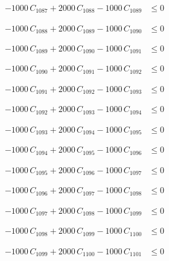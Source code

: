 \documentclass[a4paper,11pt]{article}
\begin{document}
\begin{align}
-1000\,C_{1087} + 2000\,C_{1088} - 1000\,C_{1089} &\leq 0 \nonumber
\end{align}

\begin{align}
-1000\,C_{1088} + 2000\,C_{1089} - 1000\,C_{1090} &\leq 0 \nonumber
\end{align}

\begin{align}
-1000\,C_{1089} + 2000\,C_{1090} - 1000\,C_{1091} &\leq 0 \nonumber
\end{align}

\begin{align}
-1000\,C_{1090} + 2000\,C_{1091} - 1000\,C_{1092} &\leq 0 \nonumber
\end{align}

\begin{align}
-1000\,C_{1091} + 2000\,C_{1092} - 1000\,C_{1093} &\leq 0 \nonumber
\end{align}

\begin{align}
-1000\,C_{1092} + 2000\,C_{1093} - 1000\,C_{1094} &\leq 0 \nonumber
\end{align}

\begin{align}
-1000\,C_{1093} + 2000\,C_{1094} - 1000\,C_{1095} &\leq 0 \nonumber
\end{align}

\begin{align}
-1000\,C_{1094} + 2000\,C_{1095} - 1000\,C_{1096} &\leq 0 \nonumber
\end{align}

\begin{align}
-1000\,C_{1095} + 2000\,C_{1096} - 1000\,C_{1097} &\leq 0 \nonumber
\end{align}

\begin{align}
-1000\,C_{1096} + 2000\,C_{1097} - 1000\,C_{1098} &\leq 0 \nonumber
\end{align}

\begin{align}
-1000\,C_{1097} + 2000\,C_{1098} - 1000\,C_{1099} &\leq 0 \nonumber
\end{align}

\begin{align}
-1000\,C_{1098} + 2000\,C_{1099} - 1000\,C_{1100} &\leq 0 \nonumber
\end{align}

\begin{align}
-1000\,C_{1099} + 2000\,C_{1100} - 1000\,C_{1101} &\leq 0 \nonumber
\end{align}
\end{document}
